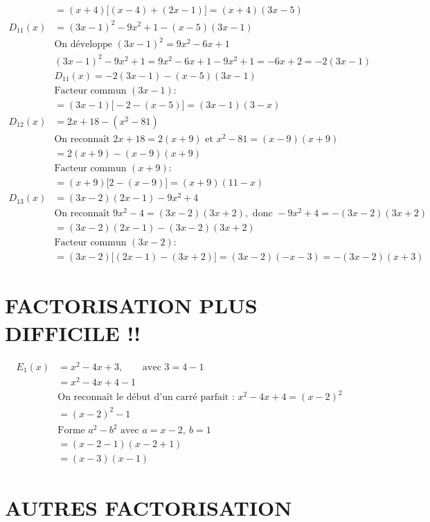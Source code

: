 \documentclass[11pt]{article}
\begin{document}
\[\begin{aligned}
		&= (x+4)\big[(x-4)+(2x-1)\big] = (x+4)(3x-5)\\[6pt]
		D_{11}(x) &= (3x-1)^2-9x^2+1-(x-5)(3x-1)\\
		&\text{On développe } (3x-1)^2 = 9x^2-6x+1\\
		&(3x-1)^2-9x^2+1 = 9x^2-6x+1-9x^2+1 = -6x+2 = -2(3x-1)\\
		&D_{11}(x) = -2(3x-1)-(x-5)(3x-1)\\
		&\text{Facteur commun } (3x-1) :\\
		&= (3x-1)\big[-2-(x-5)\big] = (3x-1)(3-x)\\[6pt]
		D_{12}(x) &= 2x+18-(x^2-81)\\
		&\text{On reconnaît } 2x+18=2(x+9) \text{ et } x^2-81=(x-9)(x+9)\\
		&= 2(x+9)-(x-9)(x+9)\\
		&\text{Facteur commun } (x+9) :\\
		&= (x+9)\big[2-(x-9)\big] = (x+9)(11-x)\\[6pt]
		D_{13}(x) &= (3x-2)(2x-1)-9x^2+4\\
		&\text{On reconnaît } 9x^2-4=(3x-2)(3x+2), \text{ donc } -9x^2+4=-(3x-2)(3x+2)\\
		&= (3x-2)(2x-1)-(3x-2)(3x+2)\\
		&\text{Facteur commun } (3x-2) :\\
		&= (3x-2)\big[(2x-1)-(3x+2)\big] = (3x-2)(-x-3) = -(3x-2)(x+3)
	\end{aligned}
	\]
	
	\section*{FACTORISATION PLUS DIFFICILE !!}
	
	\[
	\begin{aligned}
		E_1(x) &= x^2-4x+3,\qquad \text{avec } 3=4-1\\
		&= x^2-4x+4-1\\
		&\text{On reconnaît le début d'un carré parfait : } x^2-4x+4=(x-2)^2\\
		&= (x-2)^2-1\\
		&\text{Forme } a^2-b^2 \text{ avec } a=x-2,\ b=1\\
		&= (x-2-1)(x-2+1)\\
		&= (x-3)(x-1)
	\end{aligned}
	\]
	
	\section*{AUTRES FACTORISATION}
	
\end{document}
